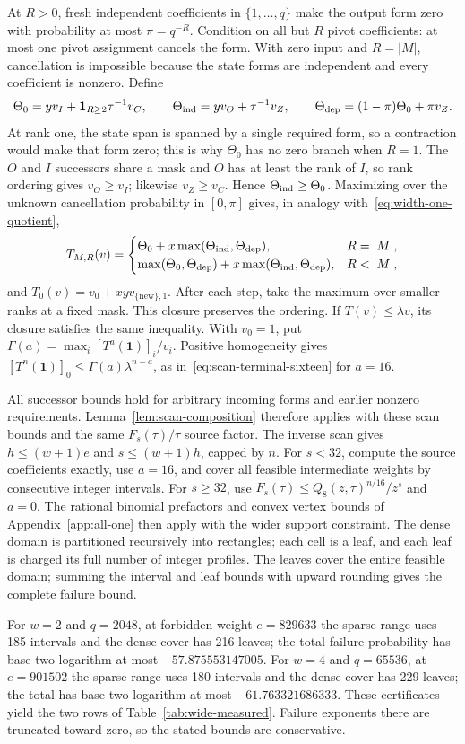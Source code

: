 At $R>0$, fresh independent coefficients in $\{1,\ldots,q\}$ make
the output form zero with probability at most $\pi=q^{-R}$.
Condition on all but $R$ pivot coefficients: at most one pivot assignment
cancels the form. With zero input and $R=|M|$, cancellation is impossible
because the state forms are independent and every coefficient is nonzero.
Define
\[
 \Theta_0=yv_I+\mathbf1_{R\ge2}\tau^{-1}v_C,\qquad
 \Theta_{\rm ind}=yv_O+\tau^{-1}v_Z,\qquad
 \Theta_{\rm dep}=(1-\pi)\Theta_0+\pi v_Z.
\]
At rank one, the state span is spanned by a single required form, so a
contraction would make that form zero; this is why $\Theta_0$ has no
zero branch when $R=1$. The $O$ and $I$ successors share a mask and $O$
has at least the rank of $I$, so rank ordering gives $v_O\ge v_I$;
likewise $v_Z\ge v_C$. Hence $\Theta_{\rm ind}\ge\Theta_0$.
Maximizing over the unknown cancellation probability in $[0,\pi]$ gives,
in analogy with~\eqref{eq:width-one-quotient},
\[
 T_{M,R}(v)=\begin{cases}
 \Theta_0+x\max(\Theta_{\rm ind},\Theta_{\rm dep}),&R=|M|,\\
 \max(\Theta_0,\Theta_{\rm dep})+x\max(\Theta_{\rm ind},\Theta_{\rm dep}),&R<|M|,
 \end{cases}
\]
and $T_0(v)=v_0+xyv_{\{\mathrm{new}\},1}$.
After each step, take the maximum over smaller ranks at a fixed mask.
This closure preserves the ordering. If $T(v)\le\lambda v$, its
closure satisfies the same inequality. With $v_0=1$, put
$\Gamma(a)=\max_i[T^a(\mathbf1)]_i/v_i$. Positive homogeneity gives
$[T^n(\mathbf1)]_0\le\Gamma(a)\lambda^{n-a}$, as
in~\eqref{eq:scan-terminal-sixteen} for $a=16$.

All successor bounds hold for arbitrary incoming forms and earlier
nonzero requirements. Lemma~\ref{lem:scan-composition} therefore applies
with these scan bounds and the same $F_s(\tau)/\tau$ source factor.
The inverse scan gives
$h\le(w+1)e$ and $s\le(w+1)h$, capped by $n$.
For $s<32$, compute the source coefficients exactly, use $a=16$, and
cover all feasible intermediate weights by consecutive integer intervals.
For $s\ge32$, use $F_s(\tau)\le Q_8(z,\tau)^{n/16}/z^s$ and $a=0$.
The rational binomial prefactors and convex vertex bounds of
Appendix~\ref{app:all-one} then apply with the wider support constraint.
The dense domain is partitioned recursively into rectangles; each cell
is a leaf, and each leaf is charged its full number of integer profiles.
The leaves cover the entire feasible domain; summing the interval and
leaf bounds with upward rounding gives the complete failure bound.

For $w=2$ and $q=2048$, at forbidden weight $e=829633$ the sparse range
uses 185 intervals and the dense cover has 216 leaves; the total failure
probability has base-two logarithm at most $-57.875553147005$. For $w=4$
and $q=65536$, at $e=901502$ the sparse range uses 180 intervals and
the dense cover has 229 leaves; the total has base-two logarithm at most
$-61.763321686333$. These certificates yield the two rows of
Table~\ref{tab:wide-measured}. Failure exponents there are truncated
toward zero, so the stated bounds are conservative.
